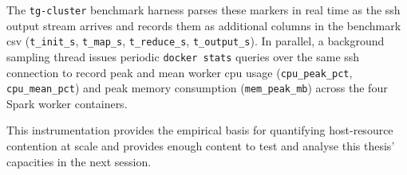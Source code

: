 The \texttt{tg-cluster} benchmark harness parses these markers in real time as the
\gls{ssh} output stream arrives and records them as additional columns in the benchmark
\gls{csv} (\texttt{t\_init\_s}, \texttt{t\_map\_s}, \texttt{t\_reduce\_s},
\texttt{t\_output\_s}).  In parallel, a background sampling thread issues periodic
\texttt{docker stats} queries over the same \gls{ssh} connection to record peak and mean
worker \gls{cpu} usage (\texttt{cpu\_peak\_pct}, \texttt{cpu\_mean\_pct}) and peak
memory consumption (\texttt{mem\_peak\_mb}) across the four Spark worker containers.

This instrumentation provides the empirical basis for quantifying host-resource contention
at scale and provides enough content to test and analyse this thesis' capacities in the next
session.
